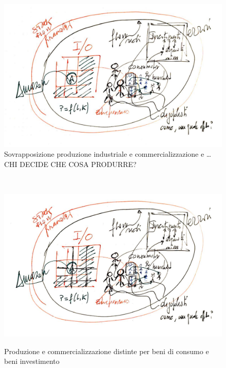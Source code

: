 \documentclass[9pt]{beamer}
\begin{document}
\begin{frame}{~} %



\begin{figure}[H]
\center
\includegraphics[scale=0.50]{6.pdf}
\caption{Sovrapposizione produzione industriale e commercializzazione e \ldots CHI DECIDE CHE COSA PRODURRE?}
\label{6}
\end{figure}

\end{frame}


\begin{frame}{~} %



\begin{figure}[H]
\center
\includegraphics[scale=0.50]{7.pdf}
\label{7}
\caption{Produzione e commercializzazione distinte per beni di consumo e beni investimento}
\end{figure}

\end{frame}
\end{document}
